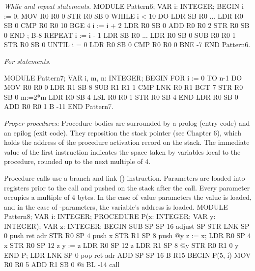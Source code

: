 \noindent {} \emph{While and repeat statements.}
\begintt
MODULE Pattern6;
  VAR i: INTEGER;
BEGIN i := 0;                        MOV R0 R0 0
                                     STR R0 SB 0
  WHILE i < 10 DO                    LDR SB R0 ...
                                     LDR R0 SB 0
                                     CMP R0 R0 10
                                     BGE 4
    i := i + 2                       LDR R0 SB 0
                                     ADD R0 R0 2
                                     STR R0 SB 0
  END ;                              B-8
  REPEAT i := i - 1                  LDR SB R0 ...
                                     LDR R0 SB 0
                                     SUB R0 R0 1
                                     STR R0 SB 0
  UNTIL i = 0                        LDR R0 SB 0
                                     CMP R0 R0 0
                                     BNE -7
END Pattern6.                        
\endtt

\noindent {} \emph{For statements.}
\begintt

MODULE Pattern7;
VAR i, m, n: INTEGER;
BEGIN
  FOR i := 0 TO n-1 DO               MOV R0 R0 0
                                     LDR R1 SB 8
                                     SUB R1 R1 1
                                     CMP LNK R0 R1
                                     BGT 7
                                     STR R0 SB 0
    m:=2*m                           LDR R0 SB 4
                                     LSL R0 R0 1
                                     STR R0 SB 4
  END                                LDR R0 SB 0
                                     ADD R0 R0 1
                                     B -11
END Pattern7.                                     
\endtt

\noindent {} \emph{Proper procedures:} Procedure bodies are surrounded by a prolog (entry code) and an epilog (exit code). They reposition the stack pointer  (see Chapter 6), which holds the address of the procedure activation record on the stack. The immediate value of the first instruction indicates the space taken by variables local to the procedure, rounded up to the next multiple of 4.

Procedure calls use a branch and link () instruction. Parameters are loaded into registers prior to the call and pushed on the stack after the call. Every parameter occupies a multiple of 4 bytes. In the case of value parameters the value is loaded, and in the case of -parameters, the variable's address is loaded.
\begintt
MODULE Pattern8;
  VAR i: INTEGER;
  PROCEDURE P(x: INTEGER; VAR y: INTEGER);
  VAR z: INTEGER;
BEGIN                  SUB SP SP 16   adjust SP
                       STR LNK SP 0   push ret adr
                       STR R0 SP 4    push x
                       STR R1 SP 8    push @y
  z := x;              LDR R0 SP 4    x
                       STR R0 SP 12   z
  y := z               LDR R0 SP 12   z
                       LDR R1 SP 8    @y
                       STR R0 R1 0    y
END P;                 LDR LNK SP 0   pop ret adr
                       ADD SP SP 16
                       B R15
BEGIN P(5, i)          MOV R0 R0 5
                       ADD R1 SB 0    @i
                       BL -14         call

